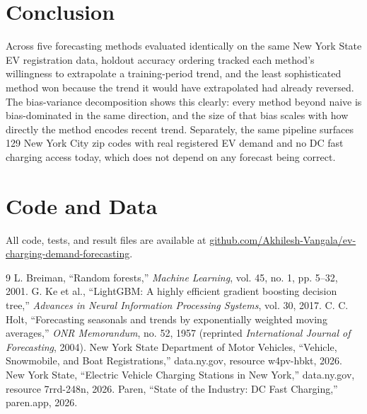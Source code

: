 \documentclass{article}
\begin{document}
\section{Conclusion}
Across five forecasting methods evaluated identically on the same New York State EV
registration data, holdout accuracy ordering tracked each method's willingness to
extrapolate a training-period trend, and the least sophisticated method won because
the trend it would have extrapolated had already reversed. The bias-variance
decomposition shows this clearly: every method beyond naive is bias-dominated in the
same direction, and the size of that bias scales with how directly the method encodes
recent trend. Separately, the same pipeline surfaces 129 New York City zip codes with
real registered EV demand and no DC fast charging access today, which does not depend
on any forecast being correct.

\section*{Code and Data}
All code, tests, and result files are available at {\small
\href{https://github.com/Akhilesh-Vangala/ev-charging-demand-forecasting}{github.com/Akhilesh-Vangala/\allowbreak ev-charging-demand-forecasting}}.

\begin{thebibliography}{9}
 L. Breiman, ``Random forests,'' \textit{Machine Learning}, vol. 45,
no. 1, pp. 5--32, 2001.
 G. Ke et al., ``LightGBM: A highly efficient gradient boosting
decision tree,'' \textit{Advances in Neural Information Processing Systems}, vol. 30,
2017.
 C. C. Holt, ``Forecasting seasonals and trends by exponentially
weighted moving averages,'' \textit{ONR Memorandum}, no. 52, 1957 (reprinted
\textit{International Journal of Forecasting}, 2004).
 New York State Department of Motor Vehicles, ``Vehicle, Snowmobile,
and Boat Registrations,'' data.ny.gov, resource w4pv-hbkt, 2026.
 New York State, ``Electric Vehicle Charging Stations in New
York,'' data.ny.gov, resource 7rrd-248n, 2026.
 Paren, ``State of the Industry: DC Fast Charging,'' paren.app, 2026.
\end{thebibliography}
\end{document}
